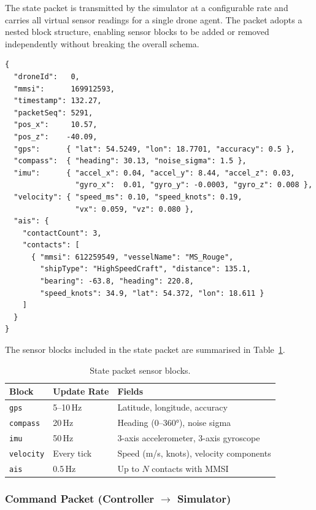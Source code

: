 The state packet is transmitted by the simulator at a configurable rate
 and carries all virtual sensor readings for a single
drone agent. The packet adopts a nested block structure, enabling sensor blocks
to be added or removed independently without breaking the overall schema.
 
\begin{lstlisting}[style=jsonStyle, caption={State packet JSON schema.}, label={lst:state_packet}]
{
  "droneId":   0,
  "mmsi":      169912593,
  "timestamp": 132.27,
  "packetSeq": 5291,
  "pos_x":     10.57,
  "pos_z":    -40.09,
  "gps":      { "lat": 54.5249, "lon": 18.7701, "accuracy": 0.5 },
  "compass":  { "heading": 30.13, "noise_sigma": 1.5 },
  "imu":      { "accel_x": 0.04, "accel_y": 8.44, "accel_z": 0.03,
                "gyro_x":  0.01, "gyro_y": -0.0003, "gyro_z": 0.008 },
  "velocity": { "speed_ms": 0.10, "speed_knots": 0.19,
                "vx": 0.059, "vz": 0.080 },
  "ais": {
    "contactCount": 3,
    "contacts": [
      { "mmsi": 612259549, "vesselName": "MS_Rouge",
        "shipType": "HighSpeedCraft", "distance": 135.1,
        "bearing": -63.8, "heading": 220.8,
        "speed_knots": 34.9, "lat": 54.372, "lon": 18.611 }
    ]
  }
}
\end{lstlisting}
 
\noindent The sensor blocks included in the state packet are summarised in
Table~\ref{tab:sensor_blocks}.
 
\begin{table}[h!]
\centering
\caption{State packet sensor blocks.}
\label{tab:sensor_blocks}
\begin{tabularx}{\linewidth}{llX}
\toprule
\textbf{Block} & \textbf{Update Rate} & \textbf{Fields} \\
\midrule
\texttt{gps}      & 5--10\,Hz  & Latitude, longitude, accuracy \\
\texttt{compass}  & 20\,Hz     & Heading (0--360°), noise sigma \\
\texttt{imu}      & 50\,Hz     & 3-axis accelerometer, 3-axis gyroscope \\
\texttt{velocity} & Every tick & Speed (m/s, knots), velocity components \\
\texttt{ais}      & 0.5\,Hz    & Up to $N$ contacts with MMSI \\
\bottomrule
\end{tabularx}
\end{table}
 
\subsubsection{Command Packet (Controller $\rightarrow$ Simulator)}
 
